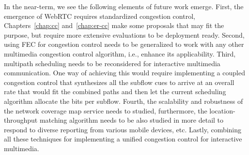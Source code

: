 
In the near-term, we see the following elements of future work emerge. First,
the emergence of WebRTC requires standardized congestion control,
Chapters~\ref{chap:cc} and~\ref{chap:er-cc} make some proposals that may fit
the purpose, but require more extensive evaluations to be deployment ready.
Second, using FEC for congestion control needs to be generalized to work with
any other multimedia congestion control algorithm, i.e., enhance its
applicability. Third, multipath scheduling needs to be reconsidered for
interactive multimedia communication. One way of achieving this would require
implementing a coupled congestion control that synthesizes all the subflow
cues to arrive at an overall rate that would fit the combined paths and then
let the current scheduling algorithm allocate the bits per subflow. Fourth,
the scalability and robustness of the network coverage map service needs to
studied, furthermore, the location-throughput matching algorithm needs to be
also studied in more detail to respond to diverse reporting from
various mobile devices, etc. Lastly, combining all these techniques for
implementing a unified congestion control for interactive multimedia.




